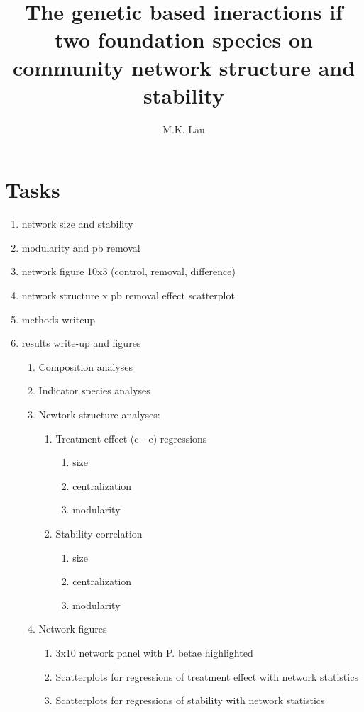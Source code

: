 \documentclass[12pt]{article}
\title{The genetic based ineractions if two foundation species on
community network structure and stability}
\author{M.K. Lau}
\begin{document}
\maketitle

\setcounter{tocdepth}{3}  %
\tableofcontents

\section{Tasks}
\begin{enumerate}
\item network size and stability
\item modularity and pb removal
\item network figure 10x3 (control, removal,  difference)
\item network structure x pb removal effect scatterplot
\item methods writeup
\item results write-up and figures
  \begin{enumerate}
  \item Composition analyses
  \item Indicator species analyses
  \item Newtork structure analyses: 
    \begin{enumerate}
    \item Treatment effect (c - e) regressions
      \begin{enumerate}
      \item size
      \item centralization
      \item modularity
      \end{enumerate}
    \item Stability correlation
      \begin{enumerate}
      \item size
      \item centralization
      \item modularity
      \end{enumerate}
    \end{enumerate}
  \item Network figures
    \begin{enumerate}
    \item 3x10 network panel with P. betae highlighted
    \item Scatterplots for regressions of treatment effect with network statistics
    \item Scatterplots for regressions of stability with network statistics
    \end{enumerate}
  \end{enumerate}
\end{enumerate}
\end{document}
